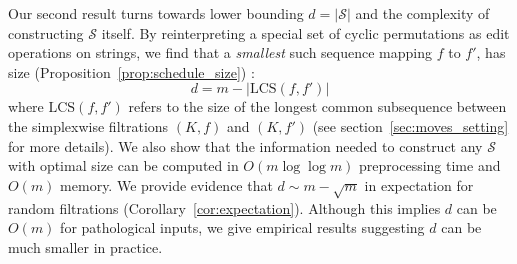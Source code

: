 \documentclass[sn-mathphys]{sn-jnl}
\begin{document}
Our second result turns towards lower bounding $d = \lvert \mathcal{S} \rvert$ and the complexity of constructing $\mathcal{S}$ itself. 
By reinterpreting a special set of cyclic permutations as edit operations on strings, we find that a  \emph{smallest} such sequence mapping $f $ to $  f'$, has size  (Proposition~\ref{prop:schedule_size}) : 
\begin{equation}
	d = m - \lvert \mathrm{LCS}(f, f') \rvert 
\end{equation}
where $\mathrm{LCS}(f,f')$ refers to the size of the longest common subsequence between the simplexwise filtrations $(K, f)$ and $(K,f')$ (see section~\ref{sec:moves_setting} for more details).
We also show that the information needed to construct any $\mathcal{S}$ with optimal size can be computed in $O(m \log \log m)$ preprocessing time and $O(m)$ memory. We provide evidence  that $d \sim m - \sqrt{m}$ in expectation for random filtrations (Corollary~\ref{cor:expectation}). Although this implies $d$ can be $O(m)$ for pathological inputs, we give empirical results suggesting $d$  can be much smaller in practice. 
% 
\end{document}
